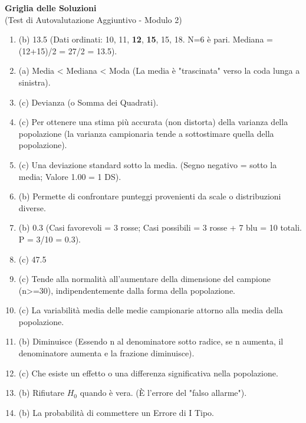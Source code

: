 \documentclass[12pt, a4paper]{article}
\begin{document}
\newpage %

\begin{center}
    \Large\textbf{Griglia delle Soluzioni} \\
    \vspace{0.5cm}
    \normalsize{(Test di Autovalutazione Aggiuntivo - Modulo 2)}
\end{center}
\vspace{1cm}

\begin{enumerate}[leftmargin=*, label=\arabic*.]
    \item (b) 13.5 (Dati ordinati: 10, 11, \textbf{12}, \textbf{15}, 15, 18. N=6 è pari. Mediana = (12+15)/2 = 27/2 = 13.5).
    \item (a) Media < Mediana < Moda (La media è "trascinata" verso la coda lunga a sinistra).
    \item (c) Devianza (o Somma dei Quadrati).
    \item (c) Per ottenere una stima più accurata (non distorta) della varianza della popolazione (la varianza campionaria tende a sottostimare quella della popolazione).
    \item (c) Una deviazione standard sotto la media. (Segno negativo = sotto la media; Valore 1.00 = 1 DS).
    \item (b) Permette di confrontare punteggi provenienti da scale o distribuzioni diverse.
    \item (b) 0.3 (Casi favorevoli = 3 rosse; Casi possibili = 3 rosse + 7 blu = 10 totali. P = 3/10 = 0.3).
    \item (c) 47.5%
    \item (c) Tende alla normalità all'aumentare della dimensione del campione (n>=30), indipendentemente dalla forma della popolazione.
    \item (c) La variabilità media delle medie campionarie attorno alla media della popolazione.
    \item (b) Diminuisce (Essendo n al denominatore sotto radice, se n aumenta, il denominatore aumenta e la frazione diminuisce).
    \item (c) Che esiste un effetto o una differenza significativa nella popolazione.
    \item (b) Rifiutare $H_0$ quando è vera. (È l'errore del "falso allarme").
    \item (b) La probabilità di commettere un Errore di I Tipo.

\end{enumerate}
\end{document}
